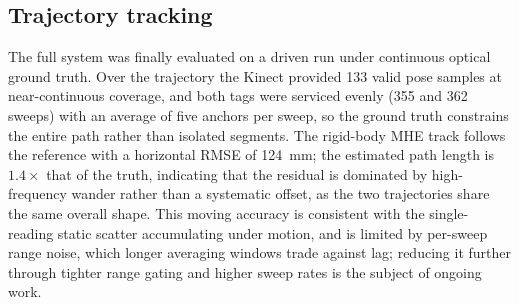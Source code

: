 \subsection{Trajectory tracking}
The full system was finally evaluated on a driven run under continuous
optical ground truth. Over the trajectory the Kinect provided 133 valid
pose samples at near-continuous coverage, and both
tags were serviced evenly (355 and 362 sweeps) with an average of five
anchors per sweep, so the ground truth constrains the entire path rather
than isolated segments. The rigid-body MHE track follows the reference
with a horizontal RMSE of \SI{124}{\milli\meter}; the estimated path
length is $1.4\times$ that of the truth, indicating that the residual is
dominated by high-frequency wander rather than a systematic offset, as
the two trajectories share the same overall shape. This moving accuracy
is consistent with the single-reading static scatter accumulating under
motion, and is limited by per-sweep range noise, which longer averaging
windows trade against lag; reducing it further through tighter range
gating and higher sweep rates is the subject of ongoing work.
